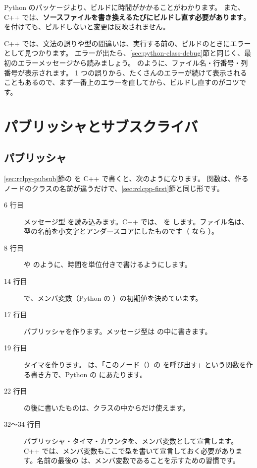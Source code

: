 Python のパッケージより、ビルドに時間がかかることがわかります。
また、C++ では、\textbf{ソースファイルを書き換えるたびにビルドし直す必要があります}。
 を付けても、ビルドしないと変更は反映されません。

\begin{caution}[ビルドのエラーを読む]
  C++ では、文法の誤りや型の間違いは、実行する前の、ビルドのときにエラーとして見つかります。
  エラーが出たら、\ref{sec:python-class-debug}節と同じく、最初のエラーメッセージから読みましょう。
   のように、ファイル名・行番号・列番号が表示されます。
  1 つの誤りから、たくさんのエラーが続けて表示されることもあるので、まず一番上のエラーを直してから、ビルドし直すのがコツです。
\end{caution}

\section{パブリッシャとサブスクライバ}
\label{sec:rclcpp-pubsub}

\subsection{パブリッシャ}

\ref{sec:rclpy-pubsub}節の  を C++ で書くと、次のようになります。
 関数は、作るノードのクラスの名前が違うだけで、\ref{sec:rclcpp-first}節と同じ形です。


\begin{description}
  \item[6 行目] メッセージ型  を読み込みます。C++ では、 を  します。ファイル名は、型の名前を小文字とアンダースコアにしたものです（ なら ）。
  \item[8 行目]  や  のように、時間を単位付きで書けるようにします。
  \item[14 行目]  で、メンバ変数（Python の ）の初期値を決めています。
  \item[17 行目] パブリッシャを作ります。メッセージ型は \cmd{<>} の中に書きます。
  \item[19 行目] タイマを作ります。 は、「このノード（）の  を呼び出す」という関数を作る書き方で、Python の  にあたります。
  \item[22 行目]  の後に書いたものは、クラスの中からだけ使えます。
  \item[32〜34 行目] パブリッシャ・タイマ・カウンタを、メンバ変数として宣言します。C++ では、メンバ変数もここで型を書いて宣言しておく必要があります。名前の最後の \cmd{\_} は、メンバ変数であることを示すための習慣です。
\end{description}

